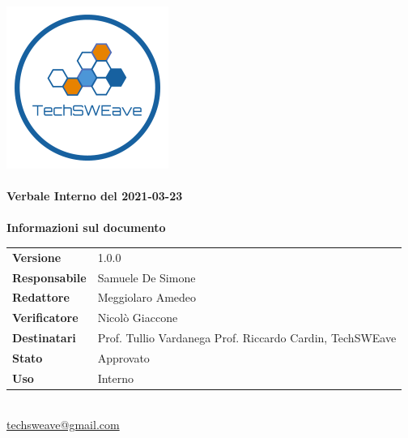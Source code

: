 \documentclass[a4paper]{article}
\begin{document}
        
    \begin{titlepage}
        \begin{center}
            \includegraphics{../../../../Images/logo.png}\\
            \vspace{20px}
            \textcolor{logo}{\hrulefill}\\
            \vspace{20px}
            \textbf{\huge\textcolor{logo}{Verbale Interno del 2021-03-23}}\\
            \vspace{10px}
            \textcolor{logo}{\hrulefill}\\
            \vspace{40px}
            \textbf{\Large Informazioni sul documento}\\
            \vspace{20px}
            \begin{tabular}{p{100px} | p{100px}}
                \textbf{Versione} & 1.0.0\\
                \textbf{Responsabile} & Samuele De Simone\\
                \textbf{Redattore} & Meggiolaro Amedeo\\
                \textbf{Verificatore} & Nicolò Giaccone\\
                \textbf{Destinatari} & Prof. Tullio Vardanega \newline Prof. Riccardo Cardin, \newline TechSWEave\\
                \textbf{Stato} & Approvato\\
                \textbf{Uso} & Interno\\
            \end{tabular}\\
            \vspace{60px}
            \href{mailto:techsweave@gmail.com}{techsweave@gmail.com}\\
    
        \end{center}
        \end{titlepage}
    
\end{document}
